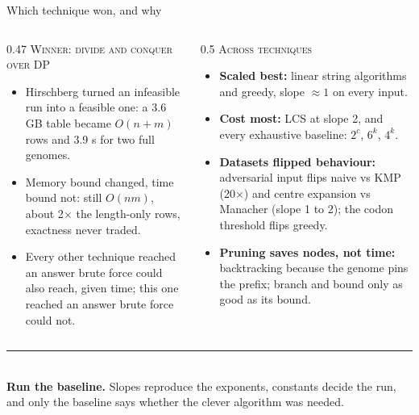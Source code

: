 \documentclass[aspectratio=169,11pt]{beamer}
\newcommand{\lead}[1]{{\color{accent}\scshape #1}}
\begin{document}
\begin{frame}{Which technique won, and why}
  \footnotesize
  \begin{columns}[T]
    \begin{column}{0.47\textwidth}
      \lead{Winner: divide and conquer over DP}
      \begin{itemize}
        \item Hirschberg turned an infeasible run into a feasible one: a 3.6 GB table became $O(n + m)$ rows and 3.9 s for two full genomes.
        \item Memory bound changed, time bound not: still $O(nm)$, about 2$\times$ the length-only rows, exactness never traded.
        \item Every other technique reached an answer brute force could also reach, given time; this one reached an answer brute force could not.
      \end{itemize}
    \end{column}
    \begin{column}{0.5\textwidth}
      \lead{Across techniques}
      \begin{itemize}
        \item \textbf{Scaled best:} linear string algorithms and greedy, slope $\approx 1$ on every input.
        \item \textbf{Cost most:} LCS at slope 2, and every exhaustive baseline: $2^c$, $6^k$, $4^k$.
        \item \textbf{Datasets flipped behaviour:} adversarial input flips naive vs KMP (20$\times$) and centre expansion vs Manacher (slope 1 to 2); the codon threshold flips greedy.
        \item \textbf{Pruning saves nodes, not time:} backtracking because the genome pins the prefix; branch and bound only as good as its bound.
      \end{itemize}
    \end{column}
  \end{columns}
  \vspace{0.1em}
  {\color{accent}\rule{\textwidth}{0.5pt}}\\[0.05em]
  \normalsize\textbf{Run the baseline.} Slopes reproduce the exponents, constants decide the run, and only the baseline says whether the clever algorithm was needed.
\end{frame}
\end{document}
